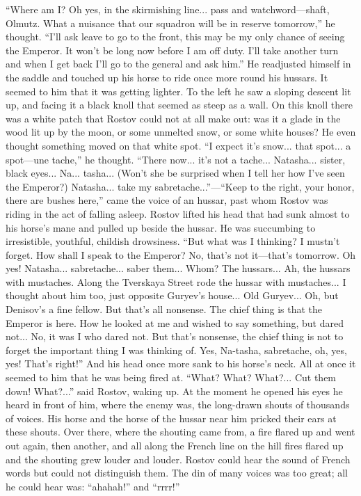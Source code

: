 ``Where am I? Oh yes, in the skirmishing line... pass and
watchword---shaft, Olmutz. What a nuisance that our squadron will
be in reserve tomorrow,'' he thought. ``I'll ask leave to go to
the front, this may be my only chance of seeing the Emperor. It
won't be long now before I am off duty. I'll take another turn
and when I get back I'll go to the general and ask him.'' He
readjusted himself in the saddle and touched up his horse to ride
once more round his hussars. It seemed to him that it was getting
lighter. To the left he saw a sloping descent lit up, and facing
it a black knoll that seemed as steep as a wall. On this knoll
there was a white patch that Rostov could not at all make out:
was it a glade in the wood lit up by the moon, or some unmelted
snow, or some white houses? He even thought something moved on
that white spot. ``I expect it's snow... that spot... a
spot---une tache,'' he thought. ``There now... it's not a
tache... Natasha... sister, black eyes... Na...  tasha... (Won't
she be surprised when I tell her how I've seen the Emperor?)
Natasha... take my sabretache...''---``Keep to the right, your
honor, there are bushes here,'' came the voice of an hussar, past
whom Rostov was riding in the act of falling asleep. Rostov
lifted his head that had sunk almost to his horse's mane and
pulled up beside the hussar. He was succumbing to irresistible,
youthful, childish drowsiness. ``But what was I thinking? I
mustn't forget. How shall I speak to the Emperor? No, that's not
it---that's tomorrow. Oh yes!  Natasha... sabretache... saber
them... Whom? The hussars... Ah, the hussars with
mustaches. Along the Tverskaya Street rode the hussar with
mustaches... I thought about him too, just opposite Guryev's
house...  Old Guryev... Oh, but Denisov's a fine fellow. But
that's all nonsense.  The chief thing is that the Emperor is
here. How he looked at me and wished to say something, but dared
not... No, it was I who dared not.  But that's nonsense, the
chief thing is not to forget the important thing I was thinking
of. Yes, Na-tasha, sabretache, oh, yes, yes! That's right!'' And
his head once more sank to his horse's neck. All at once it
seemed to him that he was being fired at. ``What? What?
What?... Cut them down! What?...'' said Rostov, waking up. At the
moment he opened his eyes he heard in front of him, where the
enemy was, the long-drawn shouts of thousands of voices. His
horse and the horse of the hussar near him pricked their ears at
these shouts. Over there, where the shouting came from, a fire
flared up and went out again, then another, and all along the
French line on the hill fires flared up and the shouting grew
louder and louder. Rostov could hear the sound of French words
but could not distinguish them. The din of many voices was too
great; all he could hear was: ``ahahah!'' and ``rrrr!''

